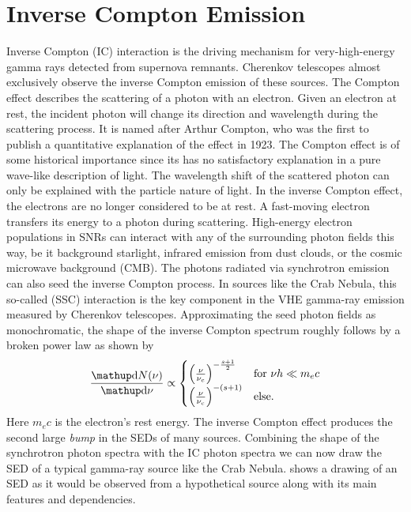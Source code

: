 \section{Inverse Compton Emission}
\label{sec:ic}
Inverse Compton (IC) interaction is the driving mechanism for very-high-energy gamma rays detected from supernova remnants. 
Cherenkov telescopes almost exclusively observe the inverse Compton emission of these sources. 
The Compton effect describes the scattering of a photon with an electron. Given an electron at rest,
the incident photon will change its direction and wavelength during the scattering process. It is named after 
Arthur Compton, who was the first to publish a quantitative explanation of the effect in 1923. The Compton effect is of some
historical importance since its has no satisfactory explanation in a pure wave-like description of light. 
The wavelength shift of the scattered photon can only be explained with the particle nature of light.  
In the inverse Compton effect, the electrons are no longer considered to be at rest. A fast-moving electron transfers its energy to 
a photon during scattering. High-energy electron populations in SNRs can interact with any of the surrounding photon fields this way,
be it background starlight, infrared emission from dust clouds, or the cosmic microwave background (CMB).
The photons radiated via synchrotron emission can also seed the inverse Compton process. In sources like the Crab Nebula, this 
so-called \emph{\ssclong} (SSC) interaction is the key component in the VHE gamma-ray emission measured 
by Cherenkov telescopes.
Approximating the seed photon fields as monochromatic, the shape of the inverse Compton spectrum roughly follows by a broken power law
as shown by~\cite{fouka_ic_shape, blumenthal_gould, lefa_kelner_shape} 
\begin{equation}
  \label{eq:ic_spectrum}
  \frac{\diff{N(\nu)}}{\diff{\nu}} \propto \begin{cases}
    \left(\frac{\nu}{\nu_c}\right)^{-\frac{s + 1}{2}} & \text{for $\nu h \ll m_e c$} \\ 
    \left(\frac{\nu}{\nu_c}\right)^{-(s + 1)} & \text{else}.
  \end{cases}
\end{equation}
Here $m_e c$ is the electron's rest energy. 
The inverse Compton effect produces the second large \emph{bump} in the SEDs of many sources.
Combining the shape of the synchrotron photon spectra with the IC photon spectra we can now draw the
SED of a typical gamma-ray source like the Crab Nebula. 
 shows a drawing of an SED as it would be observed from a hypothetical source along with its main features and dependencies.

